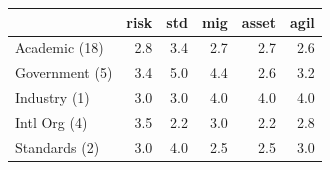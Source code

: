 \begin{tabular}{lrrrrr}
\toprule
 & risk & std & mig & asset & agil \\
\midrule
Academic (18) & 2.8 & 3.4 & 2.7 & 2.7 & 2.6 \\
Government (5) & 3.4 & 5.0 & 4.4 & 2.6 & 3.2 \\
Industry (1) & 3.0 & 3.0 & 4.0 & 4.0 & 4.0 \\
Intl Org (4) & 3.5 & 2.2 & 3.0 & 2.2 & 2.8 \\
Standards (2) & 3.0 & 4.0 & 2.5 & 2.5 & 3.0 \\
\bottomrule
\end{tabular}
